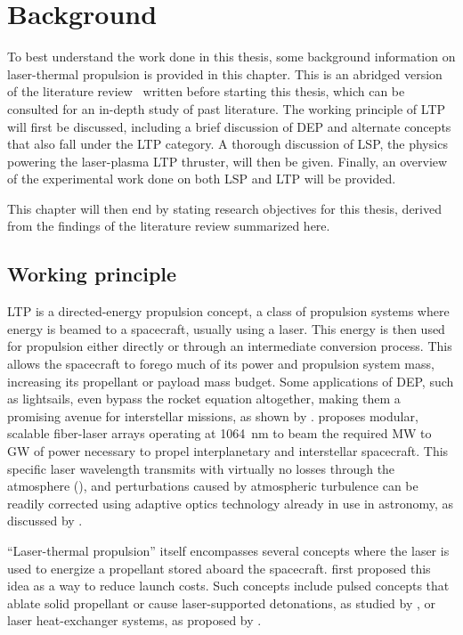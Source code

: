 \chapter{Background}
    To best understand the work done in this thesis, some background information on laser-thermal propulsion is provided in this chapter. This is an abridged version of the literature review~\cite{duplayReviewLaserThermalPropulsion2022} written before starting this thesis, which can be consulted for an in-depth study of past literature. The working principle of LTP will first be discussed, including a brief discussion of DEP and alternate concepts that also fall under the LTP category. A thorough discussion of LSP, the physics powering the laser-plasma LTP thruster, will then be given. Finally, an overview of the experimental work done on both LSP and LTP will be provided.

    This chapter will then end by stating research objectives for this thesis, derived from the findings of the literature review summarized here.

    \section{Working principle}
        LTP is a directed-energy propulsion concept, a class of propulsion systems where energy is beamed to a spacecraft, usually using a laser. This energy is then used for propulsion either directly or through an intermediate conversion process. This allows the spacecraft to forego much of its power and propulsion system mass, increasing its propellant or payload mass budget. Some applications of DEP, such as lightsails, even bypass the rocket equation altogether, making them a promising avenue for interstellar missions, as shown by \textcite{lubinRoadmapInterstellarFlight2016a}. \citeauthor{lubinRoadmapInterstellarFlight2016a} proposes modular, scalable fiber-laser arrays operating at \qty{1064}{nm} to beam the required MW to GW of power necessary to propel interplanetary and interstellar spacecraft. This specific laser wavelength transmits with virtually no losses through the atmosphere (\textcite{geminiobservatorySites2020}), and perturbations caused by atmospheric turbulence can be readily corrected using adaptive optics technology already in use in astronomy, as discussed by \textcite{eckelLaserPropulsionSystems, hettelBeamPropagationSimulation2021}.

        ``Laser-thermal propulsion'' itself encompasses several concepts where the laser is used to energize a propellant stored aboard the spacecraft. \textcite{kantrowitzRelevanceSpace1971} first proposed this idea as a way to reduce launch costs. Such concepts include pulsed concepts that ablate solid propellant or cause laser-supported detonations, as studied by \textcite{myraboPowerBeamingTechnologyLaser1984}, or laser heat-exchanger systems, as proposed by \textcite{kareLaserpoweredHeatExchanger1995}. 
        
